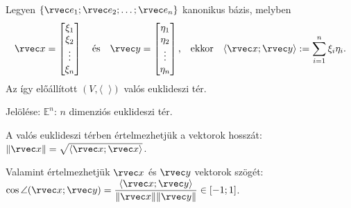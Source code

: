 \begin{definition}
  Legyen $\{ \rvec e_1; \rvec e_2; \ldots; \rvec e_n \}$ kanonikus bázis,
  melyben
  $$
    \rvec x = \begin{bmatrix}
      \xi_1  \\
      \xi_2  \\
      \vdots \\
      \xi_n
    \end{bmatrix}
    \quad\text{és}\quad
    \rvec y = \begin{bmatrix}
      \eta_1 \\
      \eta_2 \\
      \vdots \\
      \eta_n
    \end{bmatrix}
    \text,\quad\text{ekkor}\quad
    \langle \rvec x; \rvec y \rangle := \sum_{i=1}^{n} \xi_i \eta_i
    \text.
  $$
  Az így előállított $(V, \langle \phantom{x} \rangle)$ valós euklideszi tér.

  Jelölése: $\mathbb E^n$: $n$ dimenziós euklideszi tér.

  A valós euklideszi térben értelmezhetjük a vektorok hosszát:
  $\|\rvec x\| = \sqrt{\langle \rvec x; \rvec x \rangle}$.

  \vspace{.5em}
  Valamint értelmezhetjük $\rvec x$ és $\rvec y$ vektorok szögét:
  $\displaystyle
    \cos \angle(\rvec x; \rvec y)
    = \frac{\langle \rvec x; \rvec y \rangle}{\|\rvec x\| \|\rvec y\|}
    \in [-1;1]
  $.
\end{definition}




